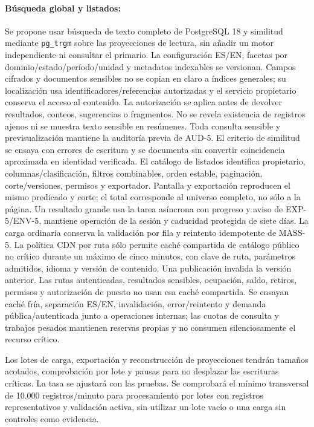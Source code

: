 \paragraph{Búsqueda global y listados:}
Se propone usar búsqueda de texto completo de PostgreSQL 18 y similitud mediante \texttt{pg\_trgm} sobre las proyecciones de lectura, sin añadir un motor independiente ni consultar el primario. La configuración ES/EN, facetas por dominio/estado/período/unidad y metadatos indexables se versionan. Campos cifrados y documentos sensibles no se copian en claro a índices generales; su localización usa identificadores/referencias autorizadas y el servicio propietario conserva el acceso al contenido.
La autorización se aplica antes de devolver resultados, conteos, sugerencias o fragmentos. No se revela existencia de registros ajenos ni se muestra texto sensible en resúmenes. Toda consulta sensible y previsualización mantiene la auditoría previa de AUD-5. El criterio de similitud se ensaya con errores de escritura y se documenta sin convertir coincidencia aproximada en identidad verificada.
El catálogo de listados identifica propietario, columnas/clasificación, filtros combinables, orden estable, paginación, corte/versiones, permisos y exportador. Pantalla y exportación reproducen el mismo predicado y corte; el total corresponde al universo completo, no sólo a la página. Un resultado grande usa la tarea asíncrona con progreso y aviso de EXP-5/ENV-5, mantiene operación de la sesión y caducidad protegida de siete días. La carga ordinaria conserva la validación por fila y reintento idempotente de MASS-5.
La política CDN por ruta sólo permite caché compartida de catálogo público no crítico durante un máximo de cinco minutos, con clave de ruta, parámetros admitidos, idioma y versión de contenido. Una publicación invalida la versión anterior. Las rutas autenticadas, resultados sensibles, ocupación, saldo, retiros, permisos y autorización de puesto no usan esa caché compartida. Se ensayan caché fría, separación ES/EN, invalidación, error/reintento y demanda pública/autenticada junto a operaciones internas; las cuotas de consulta y trabajos pesados mantienen reservas propias y no consumen silenciosamente el recurso crítico.

Los lotes de carga, exportación y reconstrucción de proyecciones tendrán tamaños acotados, comprobación por lote y pausas para no desplazar las escrituras críticas. La tasa se ajustará con las pruebas. Se comprobará el mínimo transversal de 10.000 registros/minuto para procesamiento por lotes con registros representativos y validación activa, sin utilizar un lote vacío o una carga sin controles como evidencia.

